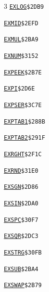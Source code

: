 \begin{multicols}{3}
\noindent\hyperlink{l:EXLOG}{\texttt{EXLOG}}\hfill\texttt{\$2DB9~\phantom{000}\llap{\pageref{l:EXLOG}}}\par
\noindent\hyperlink{l:EXMID}{\texttt{EXMID}}\hfill\texttt{\$2EFD~\phantom{000}\llap{\pageref{l:EXMID}}}\par
\noindent\hyperlink{l:EXMUL}{\texttt{EXMUL}}\hfill\texttt{\$2BA9~\phantom{000}\llap{\pageref{l:EXMUL}}}\par
\noindent\hyperlink{l:EXNUM}{\texttt{EXNUM}}\hfill\texttt{\$3152~\phantom{000}\llap{\pageref{l:EXNUM}}}\par
\noindent\hyperlink{l:EXPEEK}{\texttt{EXPEEK}}\hfill\texttt{\$2B7E~\phantom{000}\llap{\pageref{l:EXPEEK}}}\par
\noindent\hyperlink{l:EXPI}{\texttt{EXPI}}\hfill\texttt{\$2D6E~\phantom{000}\llap{\pageref{l:EXPI}}}\par
\noindent\hyperlink{l:EXPSER}{\texttt{EXPSER}}\hfill\texttt{\$3C7E~\phantom{000}\llap{\pageref{l:EXPSER}}}\par
\noindent\hyperlink{l:EXPTAB1}{\texttt{EXPTAB1}}\hfill\texttt{\$288B~\phantom{000}\llap{\pageref{l:EXPTAB1}}}\par
\noindent\hyperlink{l:EXPTAB2}{\texttt{EXPTAB2}}\hfill\texttt{\$291F~\phantom{000}\llap{\pageref{l:EXPTAB2}}}\par
\noindent\hyperlink{l:EXRGHT}{\texttt{EXRGHT}}\hfill\texttt{\$2F1C~\phantom{000}\llap{\pageref{l:EXRGHT}}}\par
\noindent\hyperlink{l:EXRND}{\texttt{EXRND}}\hfill\texttt{\$31E0~\phantom{000}\llap{\pageref{l:EXRND}}}\par
\noindent\hyperlink{l:EXSGN}{\texttt{EXSGN}}\hfill\texttt{\$2D86~\phantom{000}\llap{\pageref{l:EXSGN}}}\par
\noindent\hyperlink{l:EXSIN}{\texttt{EXSIN}}\hfill\texttt{\$2DA0~\phantom{000}\llap{\pageref{l:EXSIN}}}\par
\noindent\hyperlink{l:EXSPC}{\texttt{EXSPC}}\hfill\texttt{\$30F7~\phantom{000}\llap{\pageref{l:EXSPC}}}\par
\noindent\hyperlink{l:EXSQR}{\texttt{EXSQR}}\hfill\texttt{\$2DC3~\phantom{000}\llap{\pageref{l:EXSQR}}}\par
\noindent\hyperlink{l:EXSTRG}{\texttt{EXSTRG}}\hfill\texttt{\$30FB~\phantom{000}\llap{\pageref{l:EXSTRG}}}\par
\noindent\hyperlink{l:EXSUB}{\texttt{EXSUB}}\hfill\texttt{\$2BA4~\phantom{000}\llap{\pageref{l:EXSUB}}}\par
\noindent\hyperlink{l:EXSWAP}{\texttt{EXSWAP}}\hfill\texttt{\$2B79~\phantom{000}\llap{\pageref{l:EXSWAP}}}\par

\end{multicols}
